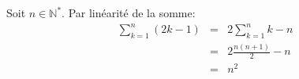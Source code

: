 Soit $n\in\mathbb{N^*}$. Par linéarité de la somme:
\begin{eqnarray}
  \sum_{k=1}^n{(2k-1)} &=& 2\sum_{k=1}^n{k}-n \nonumber \\ 
                      &=& 2\frac{n(n+1)}{2}-n \nonumber \\ 
                      &=& n^2 \nonumber
\end{eqnarray}
